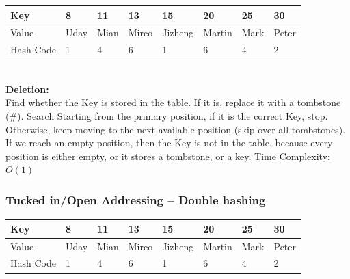 \begin{tabular}{|l|l|l|l|l|l|l|l|}
\hline
Key & 8 & 11 & 13 & 15 & 20 & 25 & 30 \\
\hline
Value & Uday & Mian & Mirco & Jizheng & Martin & Mark & Peter \\
\hline
Hash Code & 1 & 4 & 6 & 1 & 6 & 4 & 2 \\
\hline
\end{tabular}
 \\
\textbf{Deletion:} \\
Find whether the Key is stored in the table.
If it is, replace it with a tombstone (\#).
Search
Starting from the primary position, if it is the correct Key, stop.
Otherwise, keep moving to the next available position (skip over all tombstones).
If we reach an empty position, then the Key is not in the table, because every position is either empty, or it stores a tombstone, or a key.
Time Complexity: $O(1)$
 
\subsubsection{Tucked in/Open Addressing – Double hashing}
\begin{tabular}{|l|l|l|l|l|l|l|l|}
\hline
Key & 8 & 11 & 13 & 15 & 20 & 25 & 30 \\
\hline
Value & Uday & Mian & Mirco & Jizheng & Martin & Mark & Peter \\
\hline
Hash Code & 1 & 4 & 6 & 1 & 6 & 4 & 2 \\
\hline
\end{tabular} 

